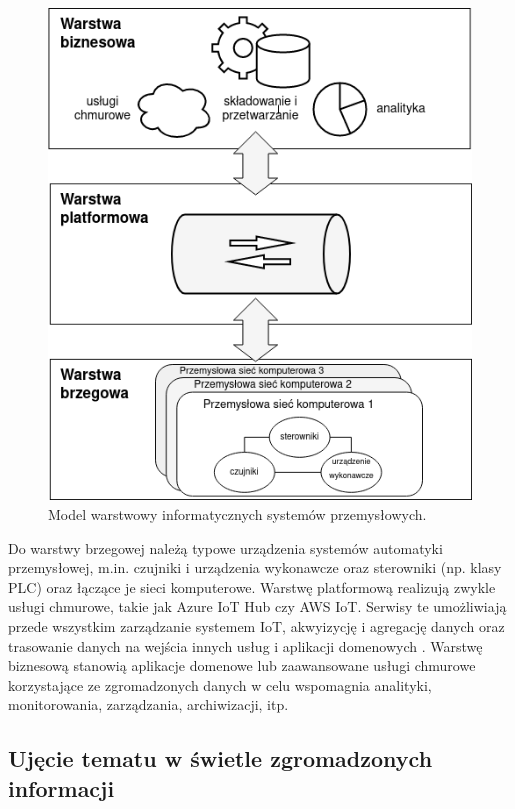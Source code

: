 \documentclass[a4paper, 12pt, twoside]{article}
\begin{document}
\begin{figure}[H]
    \centering
    \includegraphics[scale=0.50]{iiot_arch.png}
    \caption{Model warstwowy informatycznych systemów przemysłowych.}
    \label{fig:iiot-arch}
\end{figure}

Do warstwy brzegowej należą
typowe urządzenia systemów automatyki przemysłowej, m.in. czujniki i urządzenia wykonawcze oraz
sterowniki (np. klasy PLC) oraz łączące je sieci komputerowe. Warstwę platformową realizują
zwykle usługi chmurowe, takie jak Azure IoT Hub czy AWS IoT. Serwisy te umożliwiają przede wszystkim zarządzanie
systemem IoT, akwyizycję i agregację danych oraz trasowanie danych na wejścia 
innych usług i aplikacji domenowych \cite{models-innovative-iot}. Warstwę biznesową
stanowią aplikacje domenowe lub zaawansowane usługi chmurowe
korzystające ze zgromadzonych danych w celu wspomagnia
analityki, monitorowania, zarządzania, archiwizacji, itp. 

\subsection{Ujęcie tematu w świetle zgromadzonych informacji}
\end{document}
